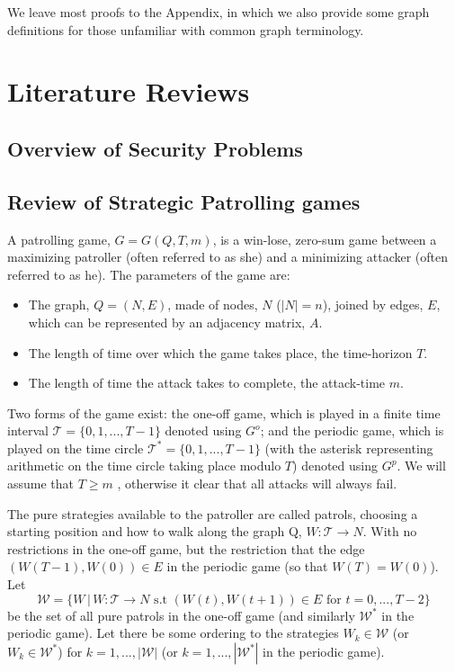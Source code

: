 \documentclass[a4paper,10pt]{article}
\theoremstyle{definition}
\theoremstyle{definition}
\theoremstyle{remark}
\theoremstyle{definition}
\begin{document}
We leave most proofs to the Appendix, in which we also provide some graph definitions for those unfamiliar with common graph terminology.

\section{Literature Reviews}
\label{Section:Literature Reviews}
\subsection{Overview of Security Problems}





\subsection{Review of Strategic Patrolling games}
A patrolling game, $G=G(Q,T,m)$, is a win-lose, zero-sum game between a maximizing patroller (often referred to as she) and a minimizing attacker (often referred to as he). The parameters of the game are:
\begin{itemize}
\item The graph, $Q=(N,E)$,   made of nodes, $N$ ($|N|=n$), joined by edges, $E$, which can be represented by an adjacency matrix, $A$.
\item The length of time over which the game takes place, the time-horizon $T$.
\item The length of time the attack takes to complete, the attack-time $m$.
\end{itemize}

Two forms of the game exist: the one-off game, which is played in a finite time interval $\mathcal{T}=\{0,1,...,T-1\}$ denoted using $G^{o}$; and the periodic game, which is played on the time circle $\mathcal{T}^*=\{0,1,...,T-1\}$ (with the asterisk representing arithmetic on the time circle taking place modulo $T$) denoted using $G^p$. We will assume that $T \geq m$ , otherwise it clear that all attacks will always fail.

The pure strategies available to the patroller are called patrols, choosing a starting position and how to walk along the graph Q, $W:\mathcal{T} \rightarrow N$. With no restrictions in the one-off game, but the restriction that the edge $(W(T-1),W(0)) \in E$ in the periodic game (so that $W(T)=W(0)$). Let $$\mathcal{W}=\{ W \, | \, W:\mathcal{T} \rightarrow N \text{ s.t } (W(t),W(t+1)) \in E \text{ for } t=0,...,T-2  \} $$ be the set of all pure patrols in the one-off game (and similarly $\mathcal{W}^*$ in the periodic game). Let there be some ordering to the strategies $W_{k} \in \mathcal{W}$ (or $W_{k} \in \mathcal{W}^{*}$) for $k=1,...,|\mathcal{W}|$ (or $k=1,...,|\mathcal{W}^*|$ in the periodic game).
\end{document}
